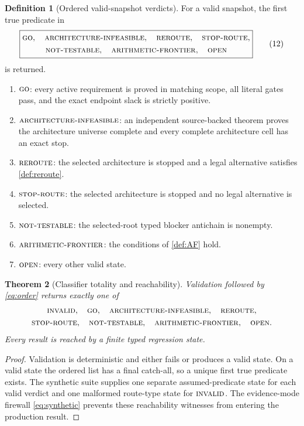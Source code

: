 \documentclass[11pt]{article}
\newtheorem{theorem}{Theorem}[section]
\theoremstyle{definition}
\newtheorem{definition}[theorem]{Definition}
\theoremstyle{remark}
\newcommand{\GO}{\textnormal{\textsc{go}}}
\newcommand{\AINF}{\textnormal{\textsc{architecture-infeasible}}}
\newcommand{\REROUTE}{\textnormal{\textsc{reroute}}}
\newcommand{\STOPR}{\textnormal{\textsc{stop-route}}}
\newcommand{\NT}{\textnormal{\textsc{not-testable}}}
\newcommand{\AF}{\textnormal{\textsc{arithmetic-frontier}}}
\newcommand{\OPEN}{\textnormal{\textsc{open}}}
\newcommand{\INVALID}{\textnormal{\textsc{invalid}}}
\begin{document}
\begin{definition}[Ordered valid-snapshot verdicts]
\label{def:order}
For a valid snapshot, the first true predicate in
\[
\boxed{
\begin{gathered}
\GO,\quad\AINF,\quad\REROUTE,\quad\STOPR,\\
\NT,\quad\AF,\quad\OPEN
\end{gathered}
}
\tag{12}\label{eq:order}
\]
is returned.
\begin{enumerate}[label=(\roman*),leftmargin=2.2em]
\item \(\GO\): every active requirement is proved in matching scope,
  all literal gates pass, and the exact endpoint slack is strictly
  positive.
\item \(\AINF\): an independent source-backed theorem proves the
  architecture universe complete and every complete architecture
  cell has an exact stop.
\item \(\REROUTE\): the selected architecture is stopped and a legal
  alternative satisfies \cref{def:reroute}.
\item \(\STOPR\): the selected architecture is stopped and no legal
  alternative is selected.
\item \(\NT\): the selected-root typed blocker antichain is nonempty.
\item \(\AF\): the conditions of \cref{def:AF} hold.
\item \(\OPEN\): every other valid state.
\end{enumerate}
\end{definition}

\begin{theorem}[Classifier totality and reachability]
\label{thm:total}
Validation followed by \eqref{eq:order} returns exactly one of
\[
\begin{gathered}
\INVALID,\quad\GO,\quad\AINF,\quad\REROUTE,\\
\STOPR,\quad\NT,\quad\AF,\quad\OPEN.
\end{gathered}
\]
Every result is reached by a finite typed regression state.
\end{theorem}

\begin{proof}
Validation is deterministic and either fails or produces a valid
state.  On a valid state the ordered list has a final catch-all, so a
unique first true predicate exists.  The synthetic suite supplies one
separate assumed-predicate state for each valid verdict and one
malformed route-type state for \(\INVALID\).  The evidence-mode
firewall \eqref{eq:synthetic} prevents these reachability witnesses
from entering the production result.
\end{proof}
\end{document}
